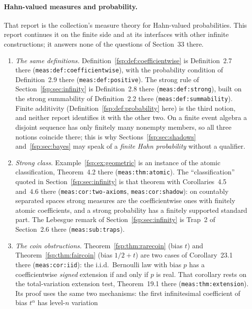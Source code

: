 \documentclass[11pt,a4paper]{article}
\numberwithin{equation}{section}
\theoremstyle{definition}
\theoremstyle{remark}
\begin{document}
\paragraph{Hahn-valued measures and probability.}
That report \cite{repomeasures} is the collection's measure theory for
Hahn-valued probabilities. This report continues it on the finite side and
at its interfaces with other infinite constructions; it answers none of the
questions of Section~33 there.
\begin{enumerate}[label=(\alph*)]
\item \emph{The same definitions.} Definition~\ref{fsp:def:coefficientwise} is
Definition~2.7 there (\nolinkurl{meas:def:coefficientwise}), with the
probability condition of Definition~2.9 there (\nolinkurl{meas:def:positive}).
The strong rule of Section~\ref{fsp:sec:infinity} is Definition~2.8 there
(\nolinkurl{meas:def:strong}), built on the strong summability of Definition~2.2
there (\nolinkurl{meas:def:summability}). Finite additivity
(Definition~\ref{fsp:def:probability} here) is the third notion, and neither report identifies it
with the other two. On a finite event algebra a disjoint sequence has only
finitely many nonempty members, so all three notions coincide there; this is
why Sections~\ref{fsp:sec:shadows} and~\ref{fsp:sec:bayes} may speak of a
\emph{finite Hahn probability} without a qualifier.
\item \emph{Strong class.} Example~\ref{fsp:ex:geometric} is an instance of the
atomic classification, Theorem~4.2 there (\nolinkurl{meas:thm:atomic}). The
``classification'' quoted in Section~\ref{fsp:sec:infinity} is that theorem with
Corollaries~4.5 and~4.6 there (\nolinkurl{meas:cor:two-axioms},
\nolinkurl{meas:cor:shadow}): on countably separated spaces strong measures are
the coefficientwise ones with finitely atomic coefficients, and a strong
probability has a finitely supported standard part. The Lebesgue remark of
Section~\ref{fsp:sec:infinity} is Trap~2 of Section~2.6 there
(\nolinkurl{meas:sub:traps}).
\item \emph{The coin obstructions.} Theorem~\ref{fsp:thm:rarecoin} (bias $t$) and
Theorem~\ref{fsp:thm:faircoin} (bias $1/2+t$) are two cases of
Corollary~23.1 there (\nolinkurl{meas:cor:iid}): the i.i.d.\ Bernoulli law with
bias $p$ has a coefficientwise \emph{signed} extension if and only if $p$ is
real. That corollary rests on the total-variation extension test, Theorem~19.1
there (\nolinkurl{meas:thm:extension}). Its proof uses the same two mechanisms:
the first infinitesimal coefficient of bias $t^\alpha$ has level-$n$ variation

\end{enumerate}
\end{document}
